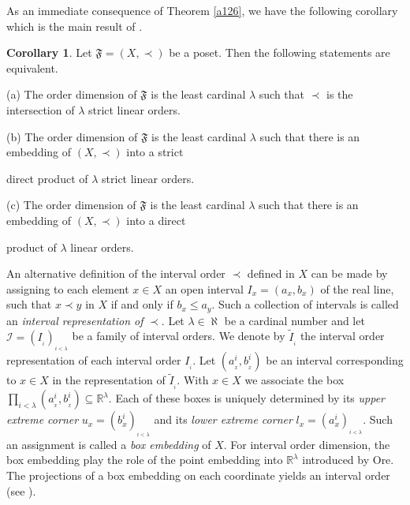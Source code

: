\documentclass{article}
\theoremstyle{definition}
\newtheorem{corollary}[theorem]{Corollary}
\begin{document}
As an immediate consequence of Theorem \ref{a126}, we have the following 
corollary which is 
the main result of \cite{MP}.





\begin{corollary}\label{a1291} Let $\mathfrak{F}=(X,\prec)$ be a poset. Then the following statements are equivalent.
\par\noindent
(a) The order dimension of $\mathfrak{F}$ is the least cardinal $\lambda$ such that $\prec$ is the intersection of $\lambda$ strict linear orders.
\par\noindent
(b) The order dimension of $\mathfrak{F}$
is the least cardinal $\lambda$ such that there is an embedding of $(X,\prec)$ into a strict  

\! \!\!direct product of $\lambda$ strict linear orders.
\par\noindent
(c) The order dimension of $\mathfrak{F}$
is the least cardinal $\lambda$ such that there is an embedding of $(X,\prec)$ into a direct 

\! \!\!product 
of $\lambda$ linear orders.
\end{corollary}












An alternative definition of the interval order $\prec$ defined in $X$ can be made by assigning to each element $x\in X$ an open interval $I_x=(a_x,b_x)$ of the real line, such that $x\prec y$ in $X$ if and only if $b_x\leq a_y$.
Such a collection of intervals is called an {\it interval representation of} $\prec$.
Let $\lambda\in \aleph$ be a cardinal number and
let $\mathcal{I}=(I_{_i})_{_{i<\lambda}}$ be a
family of interval orders.
We denote by $\widetilde{I}_{_i}$ the interval order representation of each interval order
$I_{_i}$. Let $(a_{_x}^{i},b_{_x}^{i})$ be an interval corresponding
to $x\in X$ in the representation of $\widetilde{I}_{_i}$. With $x\in X$ we associate the box $\displaystyle\prod_{i<\lambda}(a_{_x}^{i},b_{_x}^{i})\subseteq \mathbb{R}^\lambda$. Each of these boxes is uniquely determined by its {\it upper extreme corner}
$u_x=(b_x^{i})_{_{i<\lambda}}$ and its 
{\it lower extreme corner} $l_x=(a_x^{i})_{_{i<\lambda}}$.
Such an assignment is called a {\it box embedding} of $X$.
For interval order dimension, the box embedding play the role of the point embedding into $\mathbb{R}^\lambda$
introduced by Ore. The projections of  a box embedding on each coordinate yields an 
interval order (see \cite{FHM}).
\end{document}
